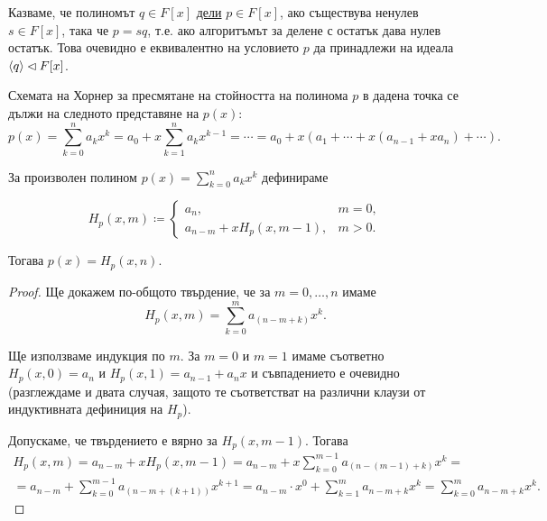 \documentclass[numbers=endperiod, DIV=15]{scrartcl}
\begin{document}
\begin{definition}
  Казваме, че полиномът $q \in F[x]$ \underline{дели} $p \in F[x]$, ако съществува ненулев $s \in F[x]$, така че $p = sq$, т.е. ако алгоритъмът за делене с остатък дава нулев остатък. Това очевидно е еквивалентно на условието $p$ да принадлежи на идеала $\left\langle q \right\rangle \lhd F[x]$.
\end{definition}

Схемата на Хорнер за пресмятане на стойността на полинома $p$ в дадена точка се дължи на следното представяне на $p(x)$:
\begin{displaymath}
  p(x) = \sum_{k=0}^n a_k x^k = a_0 + x \sum_{k=1}^n a_k x^{k-1} = \cdots = a_0 + x (a_1 + \cdots + x(a_{n-1} + x a_n) + \cdots).
\end{displaymath}

\begin{theorem}
  За произволен полином $p(x) = \sum_{k=0}^n a_k x^k$ дефинираме

  \begin{displaymath}
    H_p(x, m) \coloneqq
    \begin{cases}
      a_n, &m = 0, \\
      a_{n-m} + x H_p(x, m-1), &m > 0.
    \end{cases}
  \end{displaymath}

  Тогава $p(x) = H_p(x, n)$.
\end{theorem}
\begin{proof}
  Ще докажем по-общото твърдение, че за $m = 0, \ldots, n$ имаме
  \begin{displaymath}
    H_p(x, m) = \sum_{k=0}^m a_{(n-m+k)} x^k.
  \end{displaymath}

  Ще използваме индукция по $m$. За $m = 0$ и $m = 1$ имаме съответно $H_p(x, 0) = a_n$ и $H_p(x, 1) = a_{n-1} + a_n x$ и съвпадението е очевидно (разглеждаме и двата случая, защото те съответстват на различни клаузи от индуктивната дефиниция на $H_p$).

  Допускаме, че твърдението е вярно за $H_p(x, m-1)$. Тогава
  \begin{multline*}
    H_p(x, m)
    =
    a_{n-m} + x H_p (x, m-1)
    =
    a_{n-m} + x \sum_{k=0}^{m-1} a_{(n-(m-1)+k)} x^k
    = \\ =
    a_{n-m} + \sum_{k=0}^{m-1} a_{(n-m+(k+1))} x^{k+1}
    =
    a_{n-m} \cdot x^0 + \sum_{k=1}^m a_{n-m+k} x^k
    =
    \sum_{k=0}^m a_{n-m+k} x^k.
  \end{multline*}
\end{proof}
\end{document}
